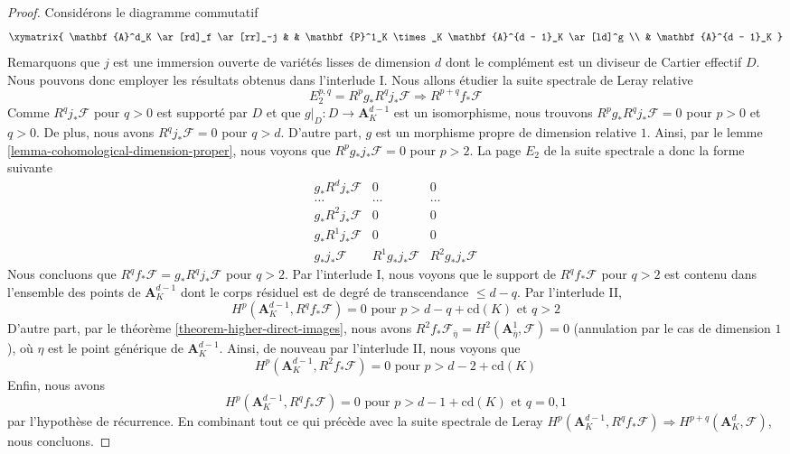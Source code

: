 \begin{proof}
\medskip\noindent
Considérons le diagramme commutatif
$$
\xymatrix{
\mathbf{A}^d_K \ar[rd]_f \ar[rr]_-j & &
\mathbf{P}^1_K \times_K \mathbf{A}^{d - 1}_K \ar[ld]^g \\
& \mathbf{A}^{d - 1}_K
}
$$
Remarquons que $j$ est une immersion ouverte de variétés lisses de dimension $d$
dont le complément est un diviseur de Cartier effectif $D$. Nous
pouvons donc employer les résultats obtenus dans l'interlude I.
Nous allons étudier la suite spectrale de Leray relative
$$
E_2^{p, q} = R^pg_*R^qj_*\mathcal{F} \Rightarrow R^{p + q}f_*\mathcal{F}
$$
Comme $R^qj_*\mathcal{F}$ pour $q > 0$ est supporté par $D$ et que
$g|_D : D \to \mathbf{A}^{d - 1}_K$ est un isomorphisme, nous trouvons
$R^pg_*R^qj_*\mathcal{F} = 0$ pour $p > 0$ et $q > 0$. De plus, nous avons
$R^qj_*\mathcal{F} = 0$ pour $q > d$. D'autre part, $g$ est un
morphisme propre de dimension relative $1$. Ainsi, par le
lemme \ref{lemma-cohomological-dimension-proper},
nous voyons que $R^pg_*j_*\mathcal{F} = 0$ pour $p > 2$. La page $E_2$
de la suite spectrale a donc la forme suivante
$$
\begin{matrix}
g_*R^dj_*\mathcal{F} & 0 & 0 \\
\ldots & \ldots & \ldots \\
g_*R^2j_*\mathcal{F} & 0 & 0 \\
g_*R^1j_*\mathcal{F} & 0 & 0 \\
g_*j_*\mathcal{F} & R^1g_*j_*\mathcal{F} & R^2g_*j_*\mathcal{F}
\end{matrix}
$$
Nous concluons que $R^qf_*\mathcal{F} = g_*R^qj_*\mathcal{F}$ pour $q > 2$.
Par l'interlude I, nous voyons que le support de $R^qf_*\mathcal{F}$ pour $q > 2$
est contenu dans l'ensemble des points de $\mathbf{A}^{d - 1}_K$
dont le corps résiduel est de degré de transcendance $\leq d - q$.
Par l'interlude II,
$$
H^p(\mathbf{A}^{d - 1}_K, R^qf_*\mathcal{F}) = 0
\text{ pour }p > d - q + \text{cd}(K)\text{ et }q > 2
$$
 D'autre part, par le théorème \ref{theorem-higher-direct-images},
nous avons $R^2f_*\mathcal{F}_{\overline{\eta}} =
H^2(\mathbf{A}^1_{\overline{\eta}}, \mathcal{F}) = 0$
(annulation par le cas de dimension $1$), où $\eta$ est le
point générique de $\mathbf{A}^{d - 1}_K$.
Ainsi, de nouveau par l'interlude II, nous voyons que
$$
H^p(\mathbf{A}^{d - 1}_K, R^2f_*\mathcal{F}) = 0
\text{ pour }p > d - 2 + \text{cd}(K)
$$
Enfin, nous avons
$$
H^p(\mathbf{A}^{d - 1}_K, R^qf_*\mathcal{F}) = 0
\text{ pour }p > d - 1 + \text{cd}(K)\text{ et }q = 0, 1
$$
par l'hypothèse de récurrence. En combinant tout ce qui précède
avec la suite spectrale de Leray
$H^p(\mathbf{A}^{d - 1}_K, R^qf_*\mathcal{F}) \Rightarrow
H^{p + q}(\mathbf{A}^d_K, \mathcal{F})$, nous concluons.
\end{proof}

